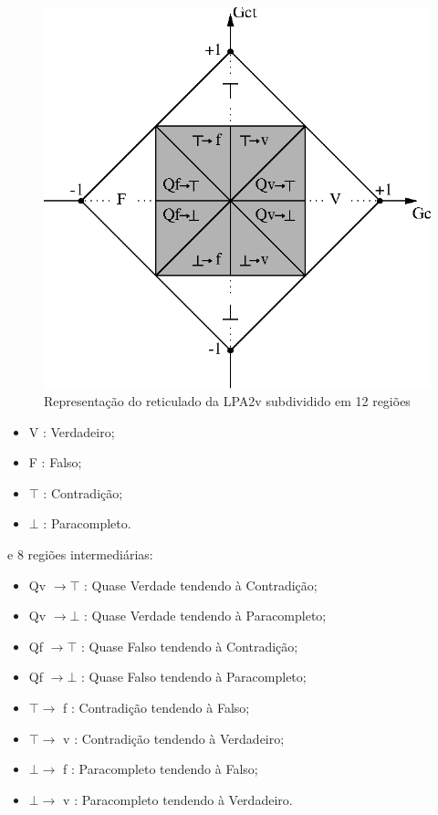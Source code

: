 \begin{figure}[!htb]
\center\includegraphics[scale=1.5]{./pic/C430gcgct.eps}
\caption{Representação do reticulado da LPA2v subdividido em 12 regiões}
\label{fig:reticuladoLPA2v}
\end{figure}


\begin{itemize}
\item V : Verdadeiro;
\item F : Falso;
\item $\top$ : Contradição;
\item $\bot$ : Paracompleto.
\end{itemize}
e 8 regiões intermediárias: 
\begin{itemize}
\item Qv $\rightarrow  \top$ : Quase Verdade tendendo à Contradição;
\item Qv $\rightarrow  \bot$ : Quase Verdade tendendo à  Paracompleto;
\item Qf $\rightarrow  \top$ : Quase Falso tendendo à Contradição;
\item Qf $\rightarrow  \bot$ : Quase Falso tendendo à Paracompleto;
\item $\top \rightarrow $ f : Contradição tendendo à Falso;
\item $\top \rightarrow $ v : Contradição tendendo à Verdadeiro;
\item $\bot \rightarrow $ f : Paracompleto tendendo à Falso;
\item $\bot \rightarrow $ v : Paracompleto tendendo à Verdadeiro.

\end{itemize}

